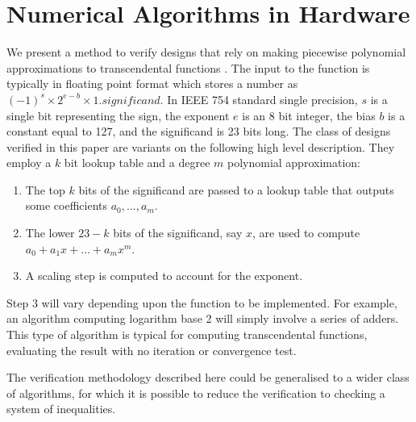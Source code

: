 \documentclass[smallcondensed]{svjour3}
\begin{document}
\section{Numerical Algorithms in Hardware}
\label{Num algos}

We present a method to verify designs that rely on making piecewise polynomial approximations to transcendental functions \cite{tang1991table,strollo2011elementary,pineiro2005high}. The input to the function is typically in floating point format \cite{goldberg1991every} which stores a number as $(-1)^{s} \times 2^{e-b} \times 1.\textit{significand}$. In IEEE 754 standard single precision, $s$ is a single bit representing the sign, the exponent $e$ is an 8 bit integer, the bias $b$ is a constant equal to 127, and the significand is 23 bits long. The class of designs verified in this paper are variants on the following high level description. They employ a $k$ bit lookup table and a degree $m$ polynomial approximation:
\begin{enumerate}
\item The top $k$ bits of the significand are passed to a lookup table that outputs some coefficients $a_0,...,a_m$.
\item The lower $23-k$ bits of the significand, say $x$, are used to compute\newline $a_0+a_1x+...+a_mx^m$.
\item A scaling step is computed to account for the exponent.
\end{enumerate} 
Step 3 will vary depending upon the function to be implemented. For example, an algorithm computing logarithm base 2 will simply involve a series of adders. This type of algorithm is typical for computing transcendental functions, evaluating the result with no iteration or convergence test.

The verification methodology described here could be generalised to a wider class of algorithms, for which it is possible to reduce the verification to checking a system of inequalities. 
\end{document}
